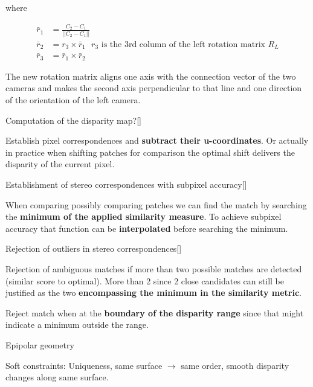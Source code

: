 \documentclass[10pt,a4paper]{scrartcl}
\begin{document}
\begin{multicols*}{2}
\begin{QandA}
\begin{enumerate}

where 

\begin{align*}
\bar{r}_1&=\frac{C_2-C_1}{||C_2-C_1||}\\
\bar{r}_2&=r_3\times\bar{r}_1\text{ $r_3$ is the 3rd column of the left rotation matrix $R_L$}\\
\bar{r}_3&=\bar{r}_1\times\bar{r}_2
\end{align*}
\end{enumerate}
\item The new rotation matrix aligns one axis with the connection vector of the two cameras and makes the second axis perpendicular to that line and one direction of the orientation of the left camera.
\end{QandA}

\begin{QandA}
{Computation of the disparity map?}[\Derivation]
\item Establish pixel correspondences and \textbf{subtract their u-coordinates}. Or actually in practice when shifting patches for comparison the optimal shift delivers the disparity of the current pixel.
\end{QandA}

\begin{QandA}
{Establishment of stereo correspondences with subpixel accuracy}[\Application]
\item When comparing possibly comparing patches we can find the match by searching the \textbf{minimum of the applied similarity measure}. To achieve subpixel accuracy that function can be \textbf{interpolated} before searching the minimum.
\end{QandA}

\begin{QandA}
{Rejection of outliers in stereo correspondences}[\Application]
\item Rejection of ambiguous matches if more than two possible matches are detected (similar score to optimal). More than 2 since 2 close candidates can still be justified as the two \textbf{encompassing the minimum in the similarity metric}.
\item Reject match when at the \textbf{boundary of the disparity range} since that might indicate a minimum outside the range.
\item Epipolar geometry
\item Soft constraints: Uniqueness, same surface $\rightarrow$ same order, smooth disparity changes along same surface.
\end{QandA}


\end{multicols*}
\end{document}
